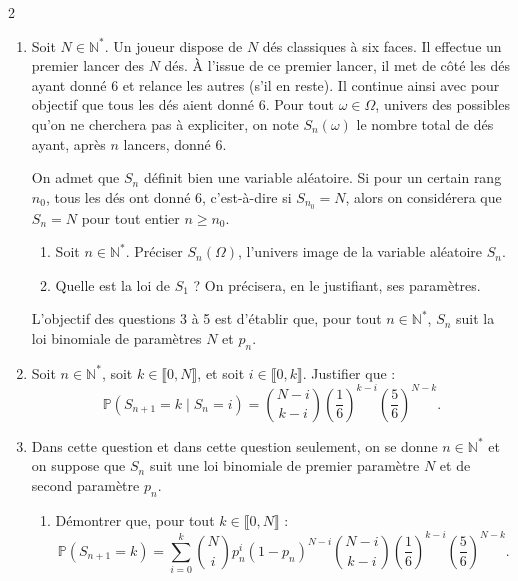 \documentclass{article}
\begin{document}
\begin{paracol}{2}
{\begin{enumerate}
    Déterminer, pour tout entier naturel $n$ non nul, une expression explicite de $p_n$ en fonction de $n$.

    \item Soit $N \in \mathbb{N}^*$. Un joueur dispose de $N$ dés classiques à six faces. Il effectue un premier lancer des $N$ dés. À l'issue de ce premier lancer, il met de côté les dés ayant donné 6 et relance les autres (s'il en reste). Il continue ainsi avec pour objectif que tous les dés aient donné 6. Pour tout $\omega \in \Omega$, univers des possibles qu'on ne cherchera pas à expliciter, on note $S_n(\omega)$ le nombre total de dés ayant, après $n$ lancers, donné 6.
    
    On admet que $S_n$ définit bien une variable aléatoire. Si pour un certain rang $n_0$, tous les dés ont donné 6, c'est-à-dire si $S_{n_0} = N$, alors on considérera que $S_n = N$ pour tout entier $n \geq n_0$.
    
    \begin{enumerate}
        \item Soit $n \in \mathbb{N}^*$. Préciser $S_n(\Omega)$, l'univers image de la variable aléatoire $S_n$.
        
        \item Quelle est la loi de $S_1$ ? On précisera, en le justifiant, ses paramètres.
    \end{enumerate}
    \switchcolumn
    \setcounter{enumi}{2}

    L'objectif des questions 3 à 5 est d'établir que, pour tout $n \in \mathbb{N}^*$, $S_n$ suit la loi binomiale de paramètres $N$ et $p_n$.
    
    \item Soit $n \in \mathbb{N}^*$, soit $k \in \llbracket 0,N \rrbracket$, et soit $i \in \llbracket 0,k \rrbracket$. Justifier que :
    \[
        \mathbb{P}(S_{n+1} = k \mid S_n = i)
        =
        \binom{N-i}{k-i}
        \left(\frac{1}{6}\right)^{k-i}
        \left(\frac{5}{6}\right)^{N-k}.
    \]
    
    \item Dans cette question et dans cette question seulement, on se donne $n \in \mathbb{N}^*$ et on suppose que $S_n$ suit une loi binomiale de premier paramètre $N$ et de second paramètre $p_n$.
    
    \begin{enumerate}
        \item Démontrer que, pour tout $k \in \llbracket 0,N \rrbracket$ :
        \[
            \mathbb{P}(S_{n+1} = k)
            =
            \sum_{i=0}^{k}
            \binom{N}{i}
            p_n^i (1-p_n)^{N-i}
            \binom{N-i}{k-i}
            \left(\frac{1}{6}\right)^{k-i}
            \left(\frac{5}{6}\right)^{N-k}.
        \]
        

\end{enumerate}
\end{enumerate}}
\end{paracol}
\end{document}
